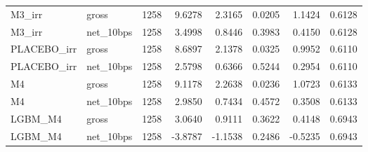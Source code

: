 \begin{tabular}{llrrrrrr}
M3\_irr & gross & 1258 & 9.6278 & 2.3165 & 0.0205 & 1.1424 & 0.6128 \\
M3\_irr & net\_10bps & 1258 & 3.4998 & 0.8446 & 0.3983 & 0.4150 & 0.6128 \\
PLACEBO\_irr & gross & 1258 & 8.6897 & 2.1378 & 0.0325 & 0.9952 & 0.6110 \\
PLACEBO\_irr & net\_10bps & 1258 & 2.5798 & 0.6366 & 0.5244 & 0.2954 & 0.6110 \\
M4 & gross & 1258 & 9.1178 & 2.2638 & 0.0236 & 1.0723 & 0.6133 \\
M4 & net\_10bps & 1258 & 2.9850 & 0.7434 & 0.4572 & 0.3508 & 0.6133 \\
LGBM\_M4 & gross & 1258 & 3.0640 & 0.9111 & 0.3622 & 0.4148 & 0.6943 \\
LGBM\_M4 & net\_10bps & 1258 & -3.8787 & -1.1538 & 0.2486 & -0.5235 & 0.6943 \\
\bottomrule
\end{tabular}
